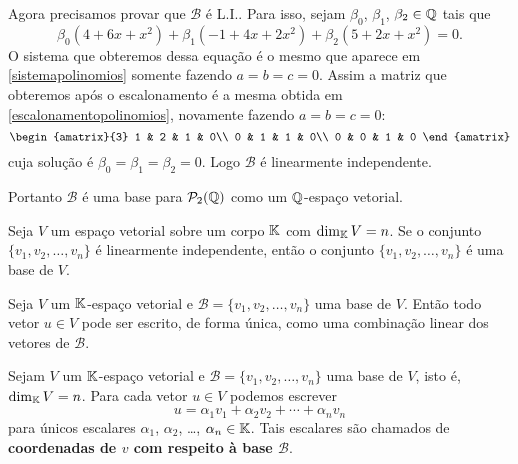 \begin{exemplos}
\begin{enumerate}
\begin{solucao}
        Agora precisamos provar que $\mathcal{B}$ é L.I.. Para isso, sejam $\beta_0$, $\beta_1$, $\beta_2 \in \mathbb{Q}$ tais que
        \[
          \beta_0(4 + 6x + x^2) + \beta_1(-1 + 4x + 2x^2) + \beta_2(5 + 2x + x^2) = 0.
        \]
        O sistema que obteremos dessa equação é o mesmo que aparece em \eqref{sistemapolinomios} somente fazendo $a = b = c = 0$. Assim a matriz que obteremos após o escalonamento é a mesma obtida em \eqref{escalonamentopolinomios}, novamente fazendo $a = b = c = 0$:
        \[
          \begin{amatrix}{3}
            1 & 2 & 1 & 0\\
            0 & 1 & 1 & 0\\
            0 & 0 & 1 & 0
          \end{amatrix}
        \]
        cuja solução é $\beta_0 = \beta_1 = \beta_2 = 0$. Logo $\mathcal{B}$ é linearmente independente.

        Portanto $\mathcal{B}$ é uma base para $\mathcal{P}_2(\mathbb{Q})$ como um $\mathbb{Q}$-espaço vetorial.
      \end{solucao}
  \end{enumerate}
\end{exemplos}

\begin{teorema}
  Seja $V$ um espaço vetorial sobre um corpo $\mathbb{K}$  com $\dim_{\mathbb{K}}V = n$.  Se o conjunto $\{v_1, v_2, \dots, v_n\}$  é linearmente independente,  então o conjunto $\{v_1, v_2, \dots, v_n\}$ é uma base de $V$.
\end{teorema}

\begin{teorema}
 Seja $V$ um $\mathbb{K}$-espaço vetorial  e $\mathcal{B} = \{v_1, v_2, \dots, v_n\}$ uma base de $V$.  Então todo vetor $u \in V$  pode ser escrito, de forma única,  como uma combinação linear dos vetores de $\mathcal{B}$.
\end{teorema}

\begin{definicao}
  Sejam $V$ um $\mathbb{K}$-espaço vetorial  e $\mathcal{B} = \{v_1, v_2, \dots, v_n\}$ uma base de $V$,  isto é, $\dim_{\mathbb{K}}V = n$.  Para cada vetor $u \in V$  podemos escrever
  \[
    u = \alpha_1v_1 + \alpha_2v_2 + \cdots + \alpha_nv_n
  \]
  para únicos escalares  $\alpha_1$, $\alpha_2$, \dots, $\alpha_n \in \mathbb{K}$.  Tais escalares são chamados de \textbf{coordenadas de $v$ com respeito à base $\mathcal{B}$}.
\end{definicao}

